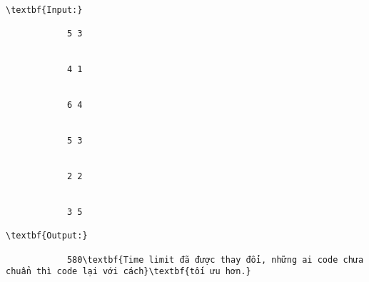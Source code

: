 \begin{verbatim}
\textbf{Input:}

            5 3


            4 1


            6 4


            5 3


            2 2


            3 5

\textbf{Output:}

            580\textbf{Time limit đã được thay đổi, những ai code chưa chuẩn thì code lại với cách}\textbf{tối ưu hơn.}\end{verbatim}